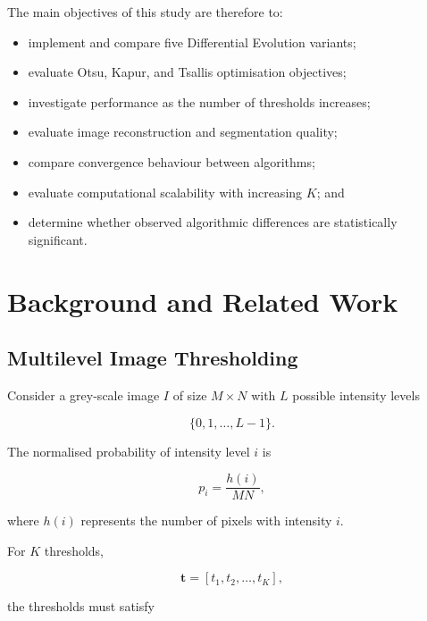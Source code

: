 \documentclass[review]{elsarticle}
\begin{document}
The main objectives of this study are therefore to:

\begin{itemize}
    \item implement and compare five Differential Evolution variants;
    \item evaluate Otsu, Kapur, and Tsallis optimisation objectives;
    \item investigate performance as the number of thresholds increases;
    \item evaluate image reconstruction and segmentation quality;
    \item compare convergence behaviour between algorithms;
    \item evaluate computational scalability with increasing $K$; and
    \item determine whether observed algorithmic differences are
          statistically significant.
\end{itemize}





\section{Background and Related Work}
\label{sec:background}

\subsection{Multilevel Image Thresholding}

Consider a grey-scale image $I$ of size $M \times N$ with
$L$ possible intensity levels

\begin{equation}
\{0,1,\ldots,L-1\}.
\end{equation}

The normalised probability of intensity level $i$ is

\begin{equation}
p_i =
\frac{h(i)}{M N},
\end{equation}

where $h(i)$ represents the number of pixels with intensity $i$.

For $K$ thresholds,

\begin{equation}
\mathbf{t} =
[t_1,t_2,\ldots,t_K],
\end{equation}

the thresholds must satisfy
\end{document}
